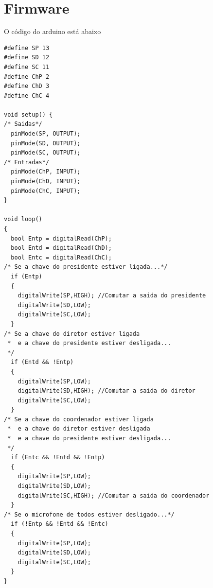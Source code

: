 \documentclass{article}
\begin{document}
\section{Firmware}
O código do arduino está abaixo
\begin{lstlisting}[style=Arduino]
#define SP 13
#define SD 12
#define SC 11
#define ChP 2
#define ChD 3
#define ChC 4

void setup() {
/* Saidas*/
  pinMode(SP, OUTPUT);
  pinMode(SD, OUTPUT);
  pinMode(SC, OUTPUT);
/* Entradas*/
  pinMode(ChP, INPUT);
  pinMode(ChD, INPUT);
  pinMode(ChC, INPUT);
}

void loop()
{
  bool Entp = digitalRead(ChP);
  bool Entd = digitalRead(ChD);
  bool Entc = digitalRead(ChC);
/* Se a chave do presidente estiver ligada...*/
  if (Entp)
  {
    digitalWrite(SP,HIGH); //Comutar a saida do presidente
    digitalWrite(SD,LOW);
    digitalWrite(SC,LOW);
  }
/* Se a chave do diretor estiver ligada
 *  e a chave do presidente estiver desligada...
 */
  if (Entd && !Entp)
  {
    digitalWrite(SP,LOW);
    digitalWrite(SD,HIGH); //Comutar a saida do diretor
    digitalWrite(SC,LOW);
  }
/* Se a chave do coordenador estiver ligada
 *  e a chave do diretor estiver desligada
 *  e a chave do presidente estiver desligada...
 */
  if (Entc && !Entd && !Entp)
  {
    digitalWrite(SP,LOW);
    digitalWrite(SD,LOW);
    digitalWrite(SC,HIGH); //Comutar a saida do coordenador
  }
/* Se o microfone de todos estiver desligado...*/
  if (!Entp && !Entd && !Entc)
  {
    digitalWrite(SP,LOW);
    digitalWrite(SD,LOW);
    digitalWrite(SC,LOW);
  }
}

\end{lstlisting}
\end{document}
